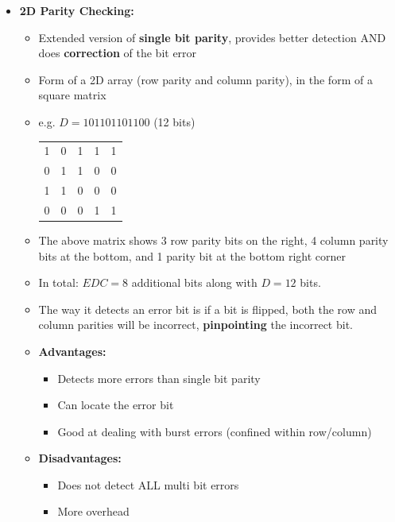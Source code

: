 \documentclass{article}
\begin{document}
\begin{itemize}
    \item \textbf{2D Parity Checking:}
    \begin{itemize}
        \item Extended version of \textbf{single bit parity}, provides better detection AND does
        \textbf{correction} of the bit error
        \item Form of a 2D array (row parity and column parity), in the form of a 
        square matrix
        \item e.g. $D=101101101100$ (12 bits)
        \begin{center}
            \begin{tabular}{cccc|c}
                1 & 0 & 1 & 1 & 1 \\
                0 & 1 & 1 & 0 & 0 \\
                1 & 1 & 0 & 0 & 0 \\
                \hline
                0 & 0 & 0 & 1 & 1
            \end{tabular}
        \end{center}
        \item The above matrix shows 3 row parity bits on the right, 4 column parity bits at 
        the bottom, and 1 parity bit at the bottom right corner
        \item In total: $EDC=8$ additional bits along with $D=12$ bits.
        \item The way it detects an error bit is if a bit is flipped, both the row and column parities
        will be incorrect, \textbf{pinpointing} the incorrect bit.
        \item \textbf{Advantages:}
        \begin{itemize}
            \item Detects more errors than single bit parity
            \item Can locate the error bit
            \item Good at dealing with burst errors (confined within row/column)
        \end{itemize}
        \item \textbf{Disadvantages:}
        \begin{itemize}
            \item Does not detect ALL multi bit errors
            \item More overhead
        \end{itemize}
    \end{itemize}


\end{itemize}
\end{document}
